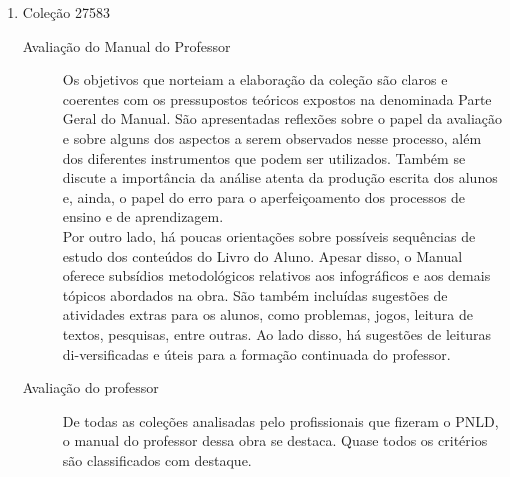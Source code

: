 \documentclass[a4paper, 12pt]{article}
\begin{document}
\begin{enumerate}
\begin{enumerate}
      
    \item Coleção 27583
      \begin{description}
      \item[Avaliação do Manual do Professor]
        Os objetivos que norteiam a elaboração da coleção são claros e coerentes com os pressupostos teóricos expostos na denominada Parte Geral do Manual. São apresentadas reflexões sobre o papel da avaliação e sobre alguns dos aspectos a serem observados  nesse  processo,  além  dos  diferentes  instrumentos  que  podem  ser  utilizados.  Também se discute a importância da análise atenta da produção escrita dos alunos e, ainda, o papel do erro para o aperfeiçoamento dos processos de ensino e de aprendizagem.\\
        Por  outro  lado,  há  poucas  orientações  sobre  possíveis  sequências  de  estudo  dos conteúdos do Livro do Aluno. Apesar disso, o Manual oferece subsídios metodológicos relativos aos infográficos e aos demais tópicos abordados na obra. São também incluídas sugestões de atividades extras para os alunos, como problemas, jogos, leitura de textos, pesquisas, entre outras. Ao lado disso, há sugestões de leituras di-versificadas e úteis para a formação continuada do professor.
      \item[Avaliação do professor]
        De todas as coleções analisadas pelo profissionais que fizeram o PNLD, o manual do professor dessa obra se destaca. Quase todos os critérios são classificados com destaque.
      \end{description}
      

\end{enumerate}
\end{enumerate}
\end{document}
